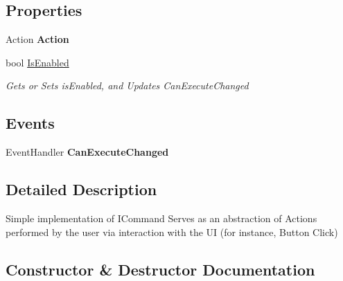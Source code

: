 \subsection*{Properties}
\begin{DoxyCompactItemize}
\item 
\hypertarget{class_prototipo_t_f_g_1_1_command_a09f81350ac5b2ef027c46bb947924d4c}{}Action {\bfseries Action}\label{class_prototipo_t_f_g_1_1_command_a09f81350ac5b2ef027c46bb947924d4c}

\item 
bool \hyperlink{class_prototipo_t_f_g_1_1_command_ab6c1c38eaed2116be378c9620304ac6a}{Is\+Enabled}
\begin{DoxyCompactList}\small\item\em Gets or Sets is\+Enabled, and Updates Can\+Execute\+Changed \end{DoxyCompactList}\end{DoxyCompactItemize}
\subsection*{Events}
\begin{DoxyCompactItemize}
\item 
\hypertarget{class_prototipo_t_f_g_1_1_command_a793c0cea61e078db18a2e1203ea7c862}{}Event\+Handler {\bfseries Can\+Execute\+Changed}\label{class_prototipo_t_f_g_1_1_command_a793c0cea61e078db18a2e1203ea7c862}

\end{DoxyCompactItemize}


\subsection{Detailed Description}
Simple implementation of I\+Command Serves as an abstraction of Actions performed by the user via interaction with the U\+I (for instance, Button Click) 



\subsection{Constructor \& Destructor Documentation}
\hypertarget{class_prototipo_t_f_g_1_1_command_a4749034ee8ae6a635a82163330afd3a4}{}
